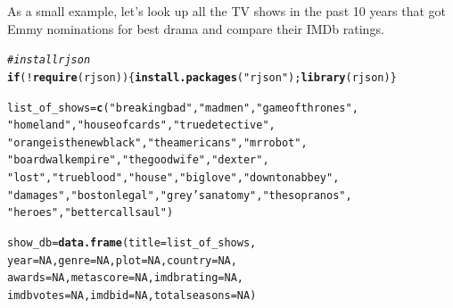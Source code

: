 \documentclass{article}\usepackage[]{graphicx}\usepackage[]{color}
\makeatletter
\newcommand{\hlnum}[1]{\textcolor[rgb]{0.686,0.059,0.569}{#1}}%
\newcommand{\hlstr}[1]{\textcolor[rgb]{0.192,0.494,0.8}{#1}}%
\newcommand{\hlcom}[1]{\textcolor[rgb]{0.678,0.584,0.686}{\textit{#1}}}%
\newcommand{\hlopt}[1]{\textcolor[rgb]{0,0,0}{#1}}%
\newcommand{\hlstd}[1]{\textcolor[rgb]{0.345,0.345,0.345}{#1}}%
\newcommand{\hlkwa}[1]{\textcolor[rgb]{0.161,0.373,0.58}{\textbf{#1}}}%
\newcommand{\hlkwb}[1]{\textcolor[rgb]{0.69,0.353,0.396}{#1}}%
\newcommand{\hlkwc}[1]{\textcolor[rgb]{0.333,0.667,0.333}{#1}}%
\newcommand{\hlkwd}[1]{\textcolor[rgb]{0.737,0.353,0.396}{\textbf{#1}}}%
\newenvironment{kframe}{%
 \def\at@end@of@kframe{}%
 \ifinner\ifhmode%
  \def\at@end@of@kframe{\end{minipage}}%
  \begin{minipage}{\columnwidth}%
 \fi\fi%
 \def\FrameCommand##1{\hskip\@totalleftmargin \hskip-\fboxsep
 \colorbox{shadecolor}{##1}\hskip-\fboxsep
     \hskip-\linewidth \hskip-\@totalleftmargin \hskip\columnwidth}%
 \MakeFramed {\advance\hsize-\width
   \@totalleftmargin\z@ \linewidth\hsize
   \@setminipage}}%
 {\par\unskip\endMakeFramed%
 \at@end@of@kframe}
\newenvironment{knitrout}{}{} %
\makeatother
\begin{document}
As a small example, let's look up all the TV shows in the past 10 years that got Emmy nominations for best drama and compare their IMDb ratings. 

\begin{knitrout}
\color{fgcolor}\begin{kframe}
\begin{alltt}
\hlcom{# install rjson}
\hlkwa{if} \hlstd{(}\hlopt{!}\hlkwd{require}\hlstd{(rjson)) \{}\hlkwd{install.packages}\hlstd{(}\hlstr{"rjson"}\hlstd{);}\hlkwd{library}\hlstd{(rjson)\}}
\end{alltt}
\end{kframe}
\end{knitrout}

\begin{knitrout}
\color{fgcolor}\begin{kframe}
\begin{alltt}
\hlstd{list_of_shows} \hlkwb{=} \hlkwd{c}\hlstd{(}\hlstr{"breaking bad"}\hlstd{,} \hlstr{"mad men"}\hlstd{,} \hlstr{"game of thrones"}\hlstd{,}
                  \hlstr{"homeland"}\hlstd{,} \hlstr{"house of cards"}\hlstd{,} \hlstr{"true detective"}\hlstd{,}
                  \hlstr{"orange is the new black"}\hlstd{,} \hlstr{"the americans"}\hlstd{,} \hlstr{"mr robot"}\hlstd{,}
                  \hlstr{"boardwalk empire"}\hlstd{,} \hlstr{"the good wife"}\hlstd{,} \hlstr{"dexter"}\hlstd{,}
                  \hlstr{"lost"}\hlstd{,} \hlstr{"true blood"}\hlstd{,} \hlstr{"house"}\hlstd{,} \hlstr{"big love"}\hlstd{,} \hlstr{"downton abbey"}\hlstd{,}
                  \hlstr{"damages"}\hlstd{,} \hlstr{"boston legal"}\hlstd{,} \hlstr{"grey's anatomy"}\hlstd{,} \hlstr{"the sopranos"}\hlstd{,}
                  \hlstr{"heroes"}\hlstd{,} \hlstr{"better call saul"}\hlstd{)}

\hlstd{show_db} \hlkwb{=} \hlkwd{data.frame}\hlstd{(}\hlkwc{title} \hlstd{= list_of_shows,}
                     \hlkwc{year} \hlstd{=} \hlnum{NA}\hlstd{,} \hlkwc{genre} \hlstd{=} \hlnum{NA}\hlstd{,} \hlkwc{plot} \hlstd{=} \hlnum{NA}\hlstd{,} \hlkwc{country} \hlstd{=} \hlnum{NA}\hlstd{,}
                     \hlkwc{awards} \hlstd{=} \hlnum{NA}\hlstd{,} \hlkwc{metascore} \hlstd{=} \hlnum{NA}\hlstd{,} \hlkwc{imdbrating} \hlstd{=} \hlnum{NA}\hlstd{,}
                     \hlkwc{imdbvotes} \hlstd{=} \hlnum{NA}\hlstd{,} \hlkwc{imdbid} \hlstd{=} \hlnum{NA}\hlstd{,} \hlkwc{totalseasons} \hlstd{=} \hlnum{NA}\hlstd{)}


\end{alltt}
\end{kframe}
\end{knitrout}
\end{document}
